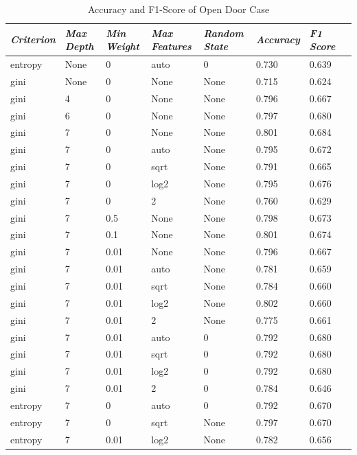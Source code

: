\documentclass[conference]{IEEEtran}
\begin{document}
\begin{table}[H]
	\centering
	\caption{Accuracy and F1-Score of Open Door Case}
	\label{AllArches}
	\begin{tabular}{|p{1cm}|p{0.7cm}|p{0.7cm}|p{0.7cm}|p{1cm}|p{1cm}|p{1cm}|p{1cm}|}
	    \hline
		\textit{Criterion} 
		& \textit{Max Depth}
		& \textit{Min Weight}
		& \textit{Max Features}
		& \textit{Random State}
		& \textit{Accuracy}
		& \textit{F1 Score}\\ \hline
		entropy & None & 0 & auto & 0 & 0.730 & 0.639\\ \hline
        gini & None & 0 & None & None & 0.715 & 0.624\\ \hline
        gini & 4 & 0 & None & None & 0.796 & 0.667\\ \hline
        gini & 6 & 0 & None & None & 0.797 & 0.680\\ \hline
        gini & 7 & 0 & None & None & 0.801 & 0.684\\ \hline
        gini & 7 & 0 & auto & None & 0.795 & 0.672\\ \hline
        gini & 7 & 0 & sqrt & None & 0.791 & 0.665\\ \hline
        gini & 7 & 0 & log2 & None & 0.795 & 0.676\\ \hline
        gini & 7 & 0 & 2 & None & 0.760 & 0.629\\ \hline
        gini & 7 & 0.5 & None & None & 0.798 & 0.673\\ \hline
        gini & 7 & 0.1 & None & None & 0.801 & 0.674\\ \hline
        gini & 7 & 0.01 & None & None & 0.796 & 0.667\\ \hline
        gini & 7 & 0.01 & auto & None & 0.781 & 0.659\\ \hline
        gini & 7 & 0.01 & sqrt & None & 0.784 & 0.660\\ \hline
        gini & 7 & 0.01 & log2 & None & \cellcolor{green!25}0.802 & 0.660\\ \hline
        gini & 7 & 0.01 & 2 & None & 0.775 & 0.661\\ \hline
        gini & 7 & 0.01 & auto & 0 & 0.792 & 0.680\\ \hline
        gini & 7 & 0.01 & sqrt & 0 & 0.792 & 0.680\\ \hline
        gini & 7 & 0.01 & log2 & 0 & 0.792 & 0.680\\ \hline
        gini & 7 & 0.01 & 2 & 0 & 0.784 & 0.646\\ \hline
        entropy & 7 & 0 & auto & 0 & 0.792 & 0.670\\ \hline
        entropy & 7 & 0 & sqrt & None & 0.797 & 0.670\\ \hline
        entropy & 7 & 0.01 & log2 & None & 0.782 & 0.656\\ \hline
	\end{tabular}
\end{table}
\end{document}
